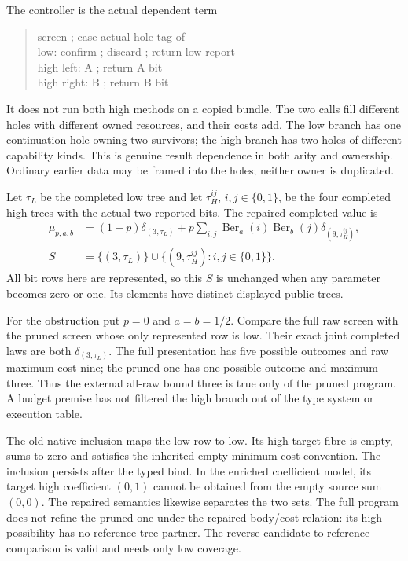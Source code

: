 \documentclass[11pt,a4paper]{article}
\theoremstyle{definition}
\begin{document}
The controller is the actual dependent term
\begin{quote}\ttfamily\small
screen ; case actual hole tag of\\
\hspace*{1em}low: confirm ; discard ; return low report\\
\hspace*{1em}high left: A ; return A bit\\
\hspace*{1em}high right: B ; return B bit
\end{quote}
It does not run both high methods on a copied bundle. The two calls fill
different holes with different owned resources, and their costs add.
The low branch has one continuation hole owning two survivors; the high
branch has two holes of different capability kinds. This is genuine
result dependence in both arity and ownership. Ordinary earlier data may
be framed into the holes; neither owner is duplicated.

Let $\tau_L$ be the completed low tree and let
$\tau_H^{ij}$, $i,j\in\{0,1\}$, be the four completed high trees with
the actual two reported bits. The repaired completed value is
\begin{align}
 \mu_{p,a,b}
   &=(1-p)\delta_{(3,\tau_L)}
      +p\sum_{i,j}\operatorname{Ber}_a(i)\operatorname{Ber}_b(j)
                           \delta_{(9,\tau_H^{ij})},\label{eq:app-law}\\
 S&=\{(3,\tau_L)\}\cup\{(9,\tau_H^{ij}):i,j\in\{0,1\}\}.
 \label{eq:app-may}
\end{align}
All bit rows here are represented, so this $S$ is unchanged when any
parameter becomes zero or one. Its elements have distinct displayed
public trees.

For the obstruction put $p=0$ and $a=b=1/2$. Compare the full raw screen
with the pruned screen whose only represented row is low. Their exact
joint completed laws are both $\delta_{(3,\tau_L)}$. The full presentation
has five possible outcomes and raw maximum cost nine; the pruned one
has one possible outcome and maximum three. Thus the external all-raw
bound three is true only of the pruned program. A budget premise has not
filtered the high branch out of the type system or execution table.

The old native inclusion maps the low row to low. Its high target fibre
is empty, sums to zero and satisfies the inherited empty-minimum cost
convention. The inclusion persists after the typed bind. In the enriched
coefficient model, its target high coefficient $(0,1)$ cannot be obtained
from the empty source sum $(0,0)$. The repaired semantics likewise
separates the two sets. The full program does not refine the pruned one
under the repaired body/cost relation: its high possibility has no
reference tree partner. The reverse candidate-to-reference comparison
is valid and needs only low coverage.
\end{document}
